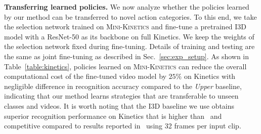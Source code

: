\documentclass[final]{cvpr}
\newcommand{\minik}{{\scshape Mini-Kinetics}\xspace}
\begin{document}
\begin{table}[!h]  \centering
    \vspace{-0.1in}
    \caption{\textbf{Transferring learned policies.} We fine-tune a Kinetics pretrained model on Kinetics full training set, with policies learned on Mini-Kinetics, and evaluate on Kinetics validation set.}
    \label{table:kinetics}
    \end{table}

\noindent\textbf{Transferring learned policies.} We now analyze whether the policies learned by our method can be transferred to novel action categories. To this end, we take the selection network trained on \minik and fine-tune a pretrained I3D model with a ResNet-50 as its backbone on full Kinetics. We keep the weights of the selection network fixed during fine-tuning. Details of training and testing are the same as joint fine-tuning as described in Sec.~\ref{sec:exp_setup}.
As shown in Table~\ref{table:kinetics}, policies learned on \minik can reduce the overall computational cost of the fine-tuned video model by $25\%$ on Kinetics with negligible difference in recognition accuracy compared to the \emph{Upper} baseline, indicating that our method learns strategies that are transferable to unseen classes and videos. It is worth noting that the I3D baseline we use obtains superior recognition performance on Kinetics that is higher than~\cite{quovadis,s3d} and competitive compared to results reported in~\cite{nonlocal} using 32 frames per input clip.
\end{document}
